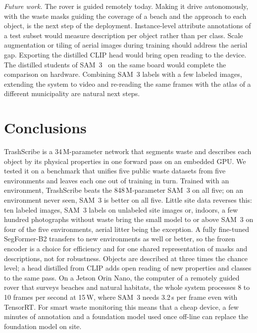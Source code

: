 \documentclass[pdflatex,sn-basic,Numbered]{sn-jnl}%
\newcommand{\trashscribe}{TrashScribe}
\begin{document}
\emph{Future work.} The rover is guided remotely today. Making it drive autonomously, with the waste masks guiding the coverage of a beach and the approach to each object, is the next step of the deployment. Instance-level attribute annotations of a test subset would measure description per object rather than per class. Scale augmentation or tiling of aerial images during training should address the aerial gap. Exporting the distilled CLIP head would bring open reading to the device. The distilled students of SAM~3~\cite{zeng2025efficientsam3} on the same board would complete the comparison on hardware. Combining SAM~3 labels with a few labeled images, extending the system to video and re-reading the same frames with the atlas of a different municipality are natural next steps.

\section{Conclusions}\label{sec:conclusions}

\trashscribe{} is a 34\,M-parameter network that segments waste and describes each object by its physical properties in one forward pass on an embedded GPU. We tested it on a benchmark that unifies five public waste datasets from five environments and leaves each one out of training in turn. Trained with an environment, \trashscribe{} beats the 848\,M-parameter SAM~3 on all five; on an environment never seen, SAM~3 is better on all five. Little site data reverses this: ten labeled images, SAM~3 labels on unlabeled site images or, indoors, a few hundred photographs without waste bring the small model to or above SAM~3 on four of the five environments, aerial litter being the exception. A fully fine-tuned SegFormer-B2 transfers to new environments as well or better, so the frozen encoder is a choice for efficiency and for one shared representation of masks and descriptions, not for robustness. Objects are described at three times the chance level; a head distilled from CLIP adds open reading of new properties and classes to the same pass. On a Jetson Orin Nano, the computer of a remotely guided rover that surveys beaches and natural habitats, the whole system processes 8 to 10 frames per second at 15\,W, where SAM~3 needs 3.2\,s per frame even with TensorRT. For smart waste monitoring this means that a cheap device, a few minutes of annotation and a foundation model used once off-line can replace the foundation model on site.
\end{document}
